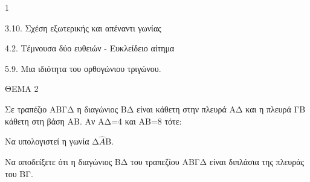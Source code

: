 \begin{ylh}{1}
    \item 3.10. Σχέση εξωτερικής και απέναντι γωνίας
    \item 4.2. Τέμνουσα δύο ευθειών - Ευκλείδειο αίτημα
    \item 5.9. Μια ιδιότητα του ορθογώνιου τριγώνου.
\end{ylh}

ΘΕΜΑ 2

Σε τραπέζιο ΑΒΓΔ η διαγώνιος ΒΔ είναι κάθετη στην πλευρά ΑΔ και η πλευρά ΓΒ κάθετη στη βάση ΑΒ. Αν ΑΔ=4 και ΑΒ=8 τότε:

\begin{alist}
\item Nα υπολογιστεί η γωνία Δ$\widehat{Α}$Β. 

\item Να αποδείξετε ότι η διαγώνιος ΒΔ του τραπεζίου ΑΒΓΔ είναι διπλάσια της πλευράς του ΒΓ. 


\begin{center}
\end{center}
\end{alist}
